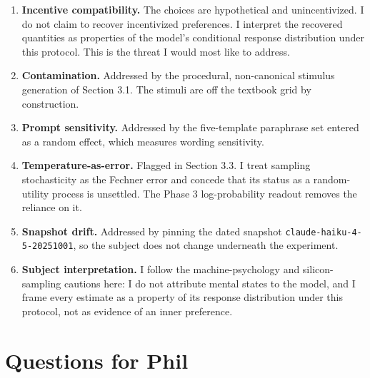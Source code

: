 \documentclass[11pt]{article}
\begin{document}
\begin{enumerate}[leftmargin=1.5em]
\item \textbf{Incentive compatibility.} The choices are hypothetical and unincentivized. I do not claim to
recover incentivized preferences. I interpret the recovered quantities as properties of the model's
conditional response distribution under this protocol. This is the threat I would most like to address.
\item \textbf{Contamination.} Addressed by the procedural, non-canonical stimulus generation of Section 3.1.
The stimuli are off the textbook grid by construction.
\item \textbf{Prompt sensitivity.} Addressed by the five-template paraphrase set entered as a random effect,
which measures wording sensitivity.
\item \textbf{Temperature-as-error.} Flagged in Section 3.3. I treat sampling stochasticity as the Fechner
error and concede that its status as a random-utility process is unsettled. The Phase 3 log-probability
readout removes the reliance on it.
\item \textbf{Snapshot drift.} Addressed by pinning the dated snapshot \texttt{claude-haiku-4-5-20251001},
so the subject does not change underneath the experiment.
\item \textbf{Subject interpretation.} I follow the machine-psychology and silicon-sampling cautions here: I
do not attribute mental states to the model, and I frame every estimate as a property of its response
distribution under this protocol, not as evidence of an inner preference.
\end{enumerate}

\section{Questions for Phil}
\end{document}
